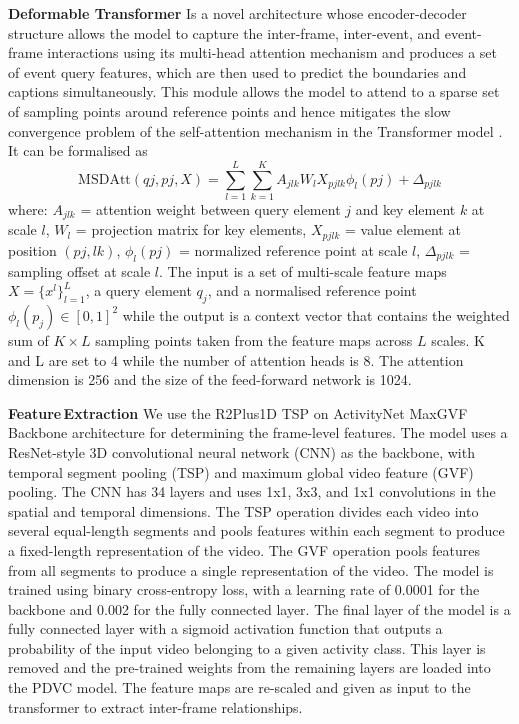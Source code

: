\textbf{Deformable Transformer} Is a novel architecture whose encoder-decoder structure allows the model to capture the inter-frame, inter-event, and event-frame interactions using its multi-head attention mechanism and produces a set of event query features, which are then used to predict the boundaries and captions simultaneously. This module allows the model to attend to a sparse set of sampling points around reference points and hence mitigates the slow convergence problem of the self-attention mechanism in the Transformer model \cite{Vaswani2017AttentionIA}. It can be formalised as 
\begin{equation}
\mathrm{MSDAtt}(qj, pj, X) = \sum_{l=1}^L \sum_{k=1}^K A_{jlk} W_l X_{pjlk} \phi_l(pj) + \Delta_{pjlk}
\end{equation}
where: $A_{jlk}$ = attention weight between query element $j$ and key element $k$ at scale $l$,
$W_l$ = projection matrix for key elements,
$X_{pjlk}$ = value element at position $(pj,lk)$,
$\phi_l(pj)$ = normalized reference point at scale $l$,
$\Delta_{pjlk}$ = sampling offset at scale $l$. The input is a set of multi-scale feature maps ${X}=\{{x}^l\}_{l=1}^{L}$, a query element $q_j$, and a normalised reference point $\phi_l(p_j) \in [0,1]^2$ while the output is a context vector that contains the weighted sum of $K \times L$ sampling points taken from the feature maps across $L$ scales. K and L are set to 4 while the number of attention heads is 8. The attention dimension is 256 and the size of the feed-forward network is 1024.

\textbf{Feature\,Extraction} We use the R2Plus1D TSP on ActivityNet MaxGVF Backbone architecture \cite{r2plus1d} for determining the frame-level features. The model uses a ResNet-style 3D convolutional neural network (CNN) as the backbone, with temporal segment pooling (TSP) and maximum global video feature (GVF) pooling. The CNN has 34 layers and uses 1x1, 3x3, and 1x1 convolutions in the spatial and temporal dimensions. The TSP operation divides each video into several equal-length segments and pools features within each segment to produce a fixed-length representation of the video. The GVF operation pools features from all segments to produce a single representation of the video. The model is trained using binary cross-entropy loss, with a learning rate of 0.0001 for the backbone and 0.002 for the fully connected layer. The final layer of the model is a fully connected layer with a sigmoid activation function that outputs a probability of the input video belonging to a given activity class. This layer is removed and the pre-trained weights from the remaining layers are loaded into the PDVC model. The feature maps are re-scaled and given as input to the transformer to extract inter-frame relationships.

